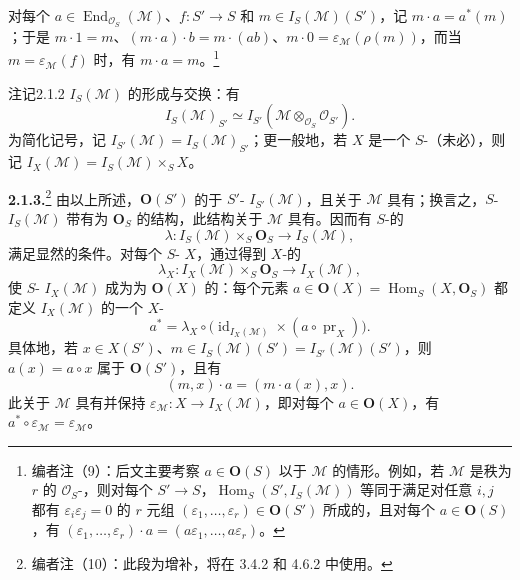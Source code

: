 对每个 $a\in\operatorname{End}_{\mathcal O_S}(\mathcal M)$、$f:S'\to S$ 和 $m\in I_S(\mathcal M)(S')$，记 $m\cdot a=a^*(m)$；于是 $m\cdot1=m$、$(m\cdot a)\cdot b=m\cdot(ab)$、$m\cdot0=\varepsilon_{\mathcal M}(\rho(m))$，而当 $m=\varepsilon_{\mathcal M}(f)$ 时，有 $m\cdot a=m$。\footnote{编者注（9）：后文主要考察 $a\in\mathbf O(S)$ 以于 $\mathcal M$ 的情形。例如，若 $\mathcal M$ 是秩为 $r$ 的 $\mathcal O_S$-，则对每个 $S'\to S$，$\operatorname{Hom}_S(S',I_S(\mathcal M))$ 等同于满足对任意 $i,j$ 都有 $\varepsilon_i\varepsilon_j=0$ 的 $r$ 元组 $(\varepsilon_1,\ldots,\varepsilon_r)\in\mathbf O(S')$ 所成的，且对每个 $a\in\mathbf O(S)$，有 $(\varepsilon_1,\ldots,\varepsilon_r)\cdot a=(a\varepsilon_1,\ldots,a\varepsilon_r)$。}
\begin{SGAresult}{注记}{2.1.2}
$I_S(\mathcal M)$ 的形成与交换：有
\[
I_S(\mathcal M)_{S'}\simeq I_{S'}(\mathcal M\otimes_{\mathcal O_S}\mathcal O_{S'}).
\]
为简化记号，记 $I_{S'}(\mathcal M)=I_S(\mathcal M)_{S'}$；更一般地，若 $X$ 是一个 $S$-（未必），则记 $I_X(\mathcal M)=I_S(\mathcal M)\times_S X$。
\end{SGAresult}
\textbf{2.1.3.}\footnote{编者注（10）：此段为增补，将在 3.4.2 和 4.6.2 中使用。} 由以上所述，$\mathbf O(S')$ 的于 $S'$- $I_{S'}(\mathcal M)$，且关于 $\mathcal M$ 具有；换言之，$S$- $I_S(\mathcal M)$ 带有为 $\mathbf O_S$ 的结构，此结构关于 $\mathcal M$ 具有。因而有 $S$-的
\[
\lambda:I_S(\mathcal M)\times_S\mathbf O_S\longrightarrow I_S(\mathcal M),
\]
满足显然的条件。对每个 $S$- $X$，通过得到 $X$-的
\[
\lambda_X:I_X(\mathcal M)\times_S\mathbf O_S\longrightarrow I_X(\mathcal M),
\]
使 $S$- $I_X(\mathcal M)$ 成为为 $\mathbf O(X)$ 的：每个元素 $a\in\mathbf O(X)=\operatorname{Hom}_S(X,\mathbf O_S)$ 都定义 $I_X(\mathcal M)$ 的一个 $X$-
\[
a^*=\lambda_X\circ\bigl(\operatorname{id}_{I_X(\mathcal M)}\times(a\circ\operatorname{pr}_X)\bigr).
\]
具体地，若 $x\in X(S')$、$m\in I_S(\mathcal M)(S')=I_{S'}(\mathcal M)(S')$，则 $a(x)=a\circ x$ 属于 $\mathbf O(S')$，且有
\[
(m,x)\cdot a=(m\cdot a(x),x).
\]
此关于 $\mathcal M$ 具有并保持 $\varepsilon_{\mathcal M}:X\to I_X(\mathcal M)$，即对每个 $a\in\mathbf O(X)$，有 $a^*\circ\varepsilon_{\mathcal M}=\varepsilon_{\mathcal M}$。

